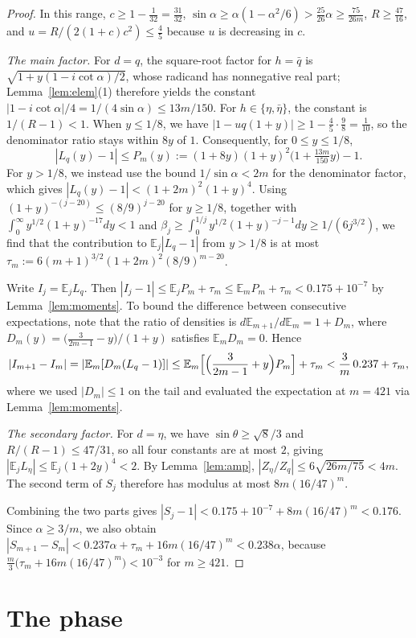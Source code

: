 \documentclass[11pt]{amsart}
\theoremstyle{remark}
\newcommand{\E}{\mathbb{E}}
\begin{document}
\begin{proof}
In this range, $c\ge1-\frac1{32}=\frac{31}{32}$,
$\sin\alpha\ge\alpha(1-\alpha^2/6)>\frac{25}{26}\alpha\ge\frac{75}{26m}$,
$R\ge\frac{47}{16}$, and $u=R/(2(1+c)c^2)\le\frac45$ because $u$ is
decreasing in $c$.

\emph{The main factor.} For $d=q$, the square-root factor for $h=\bar q$ is
$\sqrt{1+y(1-i\cot\alpha)/2}$, whose radicand has nonnegative real part;
Lemma~\ref{lem:elem}(1) therefore yields the constant
$|1-i\cot\alpha|/4=1/(4\sin\alpha)\le13m/150$. For $h\in\{\eta,\bar\eta\}$,
the constant is $1/(R-1)<1$. When $y\le1/8$, we have
$|1-uq(1+y)|\ge1-\frac45\cdot\frac98=\frac1{10}$, so the denominator ratio
stays within $8y$ of $1$. Consequently, for $0\le y\le1/8$,
\[
 |L_q(y)-1|\le P_m(y):=(1+8y)(1+y)^2\bigl(1+\tfrac{13m}{150}y\bigr)-1 .
\]
For $y>1/8$, we instead use the bound $1/\sin\alpha<2m$ for the denominator
factor, which gives $|L_q(y)-1|<(1+2m)^2(1+y)^4$. Using
$(1+y)^{-(j-20)}\le(8/9)^{j-20}$ for $y\ge1/8$, together with
$\int_0^\infty y^{1/2}(1+y)^{-17}dy<1$ and
$\beta_j\ge\int_0^{1/j}y^{1/2}(1+y)^{-j-1}dy\ge1/(6j^{3/2})$, we find that
the contribution to $\E_j|L_q-1|$ from $y>1/8$ is at most
$\tau_m:=6(m+1)^{3/2}(1+2m)^2(8/9)^{m-20}$.

Write $I_j=\E_jL_q$. Then
$|I_j-1|\le\E_jP_m+\tau_m\le\E_mP_m+\tau_m<0.175+10^{-7}$ by
Lemma~\ref{lem:moments}. To bound the difference between consecutive
expectations, note that the ratio of densities is $d\E_{m+1}/d\E_m=1+D_m$,
where $D_m(y)=\bigl(\frac3{2m-1}-y\bigr)/(1+y)$ satisfies $\E_mD_m=0$. Hence
\[
 |I_{m+1}-I_m|=|\E_m[D_m(L_q-1)]|\le\E_m\Bigl[\Bigl(\frac3{2m-1}+y\Bigr)P_m\Bigr]+\tau_m
 <\frac3m\,0.237+\tau_m,
\]
where we used $|D_m|\le1$ on the tail and evaluated the expectation at
$m=421$ via Lemma~\ref{lem:moments}.

\emph{The secondary factor.} For $d=\eta$, we have $\sin\theta\ge\sqrt8/3$
and $R/(R-1)\le47/31$, so all four constants are at most $2$, giving
$|\E_jL_\eta|\le\E_j(1+2y)^4<2$. By Lemma~\ref{lem:amp},
$|Z_\eta/Z_q|\le6\sqrt{26m/75}<4m$. The second term of $S_j$ therefore has
modulus at most $8m(16/47)^m$.

Combining the two parts gives $|S_j-1|<0.175+10^{-7}+8m(16/47)^m<0.176$.
Since $\alpha\ge3/m$, we also obtain
$|S_{m+1}-S_m|<0.237\alpha+\tau_m+16m(16/47)^m<0.238\alpha$, because
$\frac m3\bigl(\tau_m+16m(16/47)^m\bigr)<10^{-3}$ for $m\ge421$.
\end{proof}

\section{The phase}\label{sec:phase}
\end{document}
